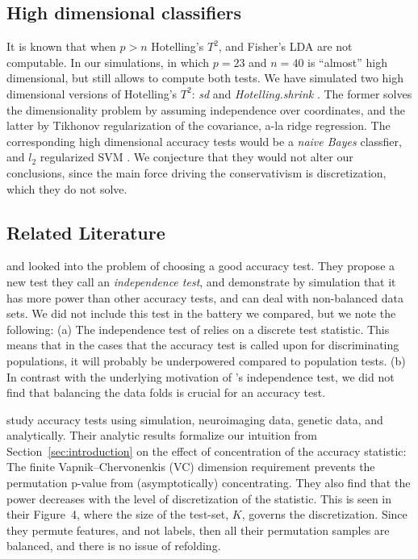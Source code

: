 \documentclass[12pt,a4paper]{article}
\theoremstyle{definition}
\begin{document}
\subsection{High dimensional classifiers}
It is known that when $p>n$ Hotelling's $T^2$, and Fisher's LDA are not computable. 
In our simulations, in which $p=23$ and $n=40$ is ``almost'' high dimensional, but still allows to compute both tests.
We have simulated two high dimensional versions of Hotelling's $T^2$: \emph{sd} \citep{srivastava_multivariate_2007} and \emph{Hotelling.shrink} \citep{schafer_shrinkage_2005}. 
The former solves the dimensionality problem by assuming independence over coordinates, and the latter by Tikhonov regularization of the covariance, a-la ridge regression. 
The corresponding high dimensional accuracy tests would be a \emph{naive Bayes} classfier, and $l_2$ regularized SVM \citep{ramdas_classification_2016}.
We conjecture that they would not alter our conclusions, since the main force driving the conservativism is discretization, which they do not solve. 


\subsection{Related Literature}
\cite{olivetti_induction_2012} and \cite{olivetti_statistical_2014} looked into the problem of choosing a good accuracy test. 
They propose a new test they call an \emph{independence test}, and demonstrate by simulation that it has more power than other accuracy tests, and can deal with non-balanced data sets. 
We did not include this test in the battery we compared, but we note the following: 
(a) The independence test of \cite{olivetti_induction_2012} relies on a discrete test statistic. This means that in the cases that the accuracy test is called upon for discriminating populations, it will probably be underpowered compared to population tests. 
(b) In contrast with the underlying motivation of \cite{olivetti_induction_2012}'s independence test, we did not find that balancing the data folds is crucial for an accuracy test. 

\cite{golland_permutation_2005} study accuracy tests using simulation, neuroimaging data, genetic data, and analytically.
Their analytic results formalize our intuition from Section~\ref{sec:introduction} on the effect of concentration of the accuracy statistic:
The finite Vapnik–Chervonenkis (VC) dimension requirement \citep[Sec 4.3]{golland_permutation_2003} prevents the permutation p-value from (asymptotically) concentrating. 
They also find that the power decreases with the level of discretization of the statistic. 
This is seen in their Figure~4, where the size of the test-set, $K$, governs the discretization. 
Since they permute features, and not labels, then all their permutation samples are balanced, and there is no issue of refolding. 
\end{document}
